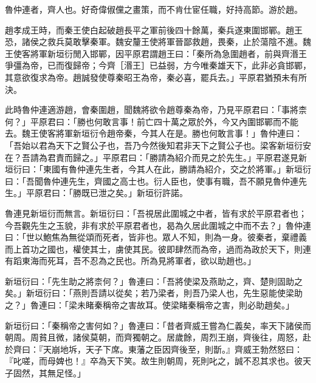 
\begin{pinyinscope}
魯仲連者，齊人也。好奇偉俶儻之畫策，而不肯仕宦任職，好持高節。游於趙。

趙孝成王時，而秦王使白起破趙長平之軍前後四十餘萬，秦兵遂東圍邯鄲。趙王恐，諸侯之救兵莫敢擊秦軍。魏安釐王使將軍晉鄙救趙，畏秦，止於蕩陰不進。魏王使客將軍新垣衍閒入邯鄲，因平原君謂趙王曰：「秦所為急圍趙者，前與齊湣王爭彊為帝，已而復歸帝；今齊［湣王］已益弱，方今唯秦雄天下，此非必貪邯鄲，其意欲復求為帝。趙誠發使尊秦昭王為帝，秦必喜，罷兵去。」平原君猶預未有所決。

此時魯仲連適游趙，會秦圍趙，聞魏將欲令趙尊秦為帝，乃見平原君曰：「事將柰何？」平原君曰：「勝也何敢言事！前亡四十萬之眾於外，今又內圍邯鄲而不能去。魏王使客將軍新垣衍令趙帝秦，今其人在是。勝也何敢言事！」魯仲連曰：「吾始以君為天下之賢公子也，吾乃今然後知君非天下之賢公子也。梁客新垣衍安在？吾請為君責而歸之。」平原君曰：「勝請為紹介而見之於先生。」平原君遂見新垣衍曰：「東國有魯仲連先生者，今其人在此，勝請為紹介，交之於將軍。」新垣衍曰：「吾聞魯仲連先生，齊國之高士也。衍人臣也，使事有職，吾不願見魯仲連先生。」平原君曰：「勝既已泄之矣。」新垣衍許諾。

魯連見新垣衍而無言。新垣衍曰：「吾視居此圍城之中者，皆有求於平原君者也；今吾觀先生之玉貌，非有求於平原君者也，曷為久居此圍城之中而不去？」魯仲連曰：「世以鮑焦為無從頌而死者，皆非也。眾人不知，則為一身。彼秦者，棄禮義而上首功之國也，權使其士，虜使其民。彼即肆然而為帝，過而為政於天下，則連有蹈東海而死耳，吾不忍為之民也。所為見將軍者，欲以助趙也。」

新垣衍曰：「先生助之將柰何？」魯連曰：「吾將使梁及燕助之，齊、楚則固助之矣。」新垣衍曰：「燕則吾請以從矣；若乃梁者，則吾乃梁人也，先生惡能使梁助之？」魯連曰：「梁未睹秦稱帝之害故耳。使梁睹秦稱帝之害，則必助趙矣。」

新垣衍曰：「秦稱帝之害何如？」魯連曰：「昔者齊威王嘗為仁義矣，率天下諸侯而朝周。周貧且微，諸侯莫朝，而齊獨朝之。居歲餘，周烈王崩，齊後往，周怒，赴於齊曰：『天崩地坼，天子下席。東藩之臣因齊後至，則斮。』齊威王勃然怒曰：『叱嗟，而母婢也！』卒為天下笑。故生則朝周，死則叱之，誠不忍其求也。彼天子固然，其無足怪。」


\end{pinyinscope}
